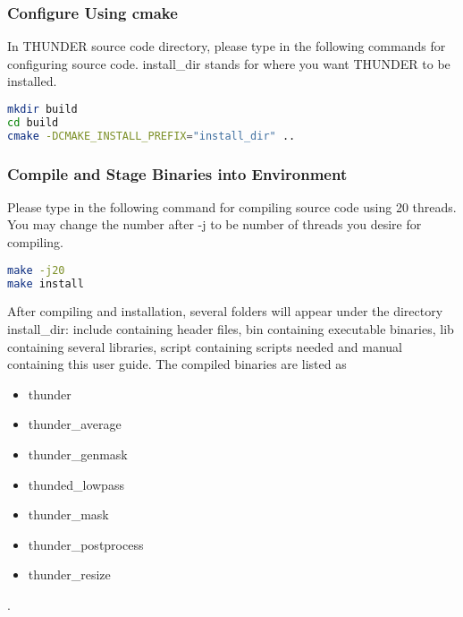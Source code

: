 \documentclass{article}
\begin{document}
            \subsubsection{Configure Using \textsf{cmake}}
            
                In THUNDER source code directory, please type in the following commands for configuring source code. \textsf{install\_dir} stands for where you want THUNDER to be installed.
            
                \begin{lstlisting}[language={sh}]
mkdir build
cd build
cmake -DCMAKE_INSTALL_PREFIX="install_dir" ..
                \end{lstlisting}
            
            \subsubsection{Compile and Stage Binaries into Environment}
            
                Please type in the following command for compiling source code using 20 threads. You may change the number after \textsf{-j} to be number of threads you desire for compiling.
                
                \begin{lstlisting}[language={sh}]
make -j20
make install
                \end{lstlisting}
                
                After compiling and installation, several folders will appear under the directory \textsf{install\_dir}: \textsf{include} containing header files, \textsf{bin} containing executable binaries, \textsf{lib} containing several libraries, \textsf{script} containing scripts needed and \textsf{manual} containing this user guide. The compiled binaries are listed as
                \begin{itemize}
                    \item \textsf{thunder}
                    \item \textsf{thunder\_average}
                    \item \textsf{thunder\_genmask}
                    \item \textsf{thunded\_lowpass}
                    \item \textsf{thunder\_mask}
                    \item \textsf{thunder\_postprocess}
                    \item \textsf{thunder\_resize}
                \end{itemize}.
                
\end{document}
